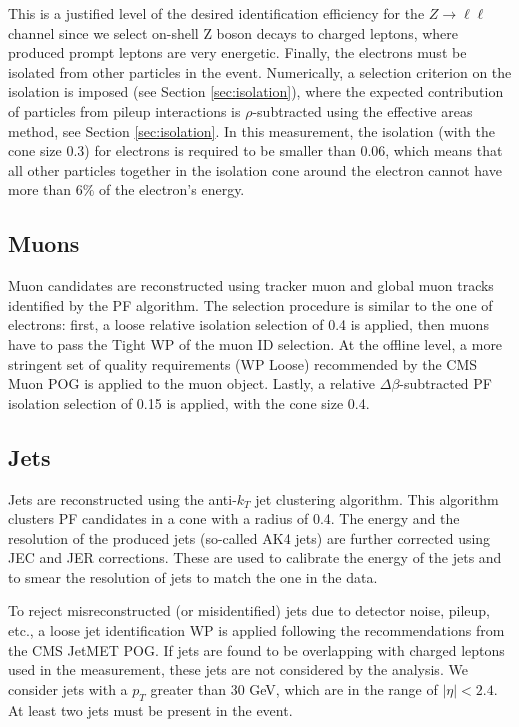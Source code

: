 This is a justified level of the desired identification efficiency for the $Z \to \ell \ell$ channel since we select on-shell Z boson decays to charged leptons, where produced prompt leptons are very energetic. Finally, the electrons must be isolated from other particles in the event. Numerically, a selection criterion on the isolation is imposed (see Section \ref{sec:isolation}), where the expected contribution of particles from pileup interactions is $\rho$-subtracted using the effective areas method, see Section \ref{sec:isolation}. In this measurement, the isolation (with the cone size 0.3) for electrons is required to be smaller than 0.06, which means that all other particles together in the isolation cone around the electron cannot have more than 6$\%$ of the electron's energy.

\subsection{Muons}\label{sec:muons}
Muon candidates are reconstructed using tracker muon and global muon tracks identified by the PF algorithm. The selection procedure is similar to the one of electrons: first, a loose relative isolation selection of 0.4 is applied, then muons have to pass the Tight WP of the muon ID selection. 
At the offline level, a more stringent set of quality requirements (WP Loose) recommended by the CMS Muon POG is applied to the muon object.
Lastly, a relative $\Delta\beta$-subtracted PF isolation selection of 0.15 is applied, with the cone size 0.4.

\subsection{Jets}\label{sec:jets}
Jets are reconstructed using the anti-$k_T$ jet clustering algorithm. This algorithm clusters PF candidates in a cone with a radius of 0.4. The energy and the resolution of the produced jets (so-called AK4 jets) are further corrected using JEC and JER corrections. These are used to calibrate the energy of the jets and to smear the resolution of jets to match the one in the data. 

To reject misreconstructed (or misidentified) jets due to detector noise, pileup, etc., a loose jet identification WP is applied following the recommendations from the CMS JetMET POG. If jets are found to be overlapping with charged leptons used in the measurement, these jets are not considered by the analysis. We consider jets with a $p_T$ greater than 30 GeV, which are in the range of $|\eta| < 2.4$. At least two jets must be present in the event. 

